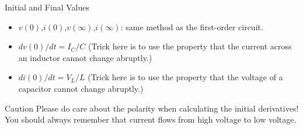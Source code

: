 \documentclass{beamer}
\begin{document}
\begin{frame}{Initial and Final Values}
    \begin{itemize}
        \item $v(0)$,$i(0)$,$v(\infty)$,$i(\infty)$: same method as the first-order circuit.
        \item $dv(0)/dt=I_C/C$ (Trick here is to use the property that the current across an inductor cannot change abruptly.)
        \item $di(0)/dt=V_L/L$ (Trick here is to use the property that the voltage of a capacitor cannot change abruptly.)
    \end{itemize}
    \begin{alertblock}{Caution}
    Please do care about the polarity when calculating the initial derivatives! You should always remember that current flows from high voltage to low voltage.  
    
    \end{alertblock}

    
\end{frame}

\end{document}
